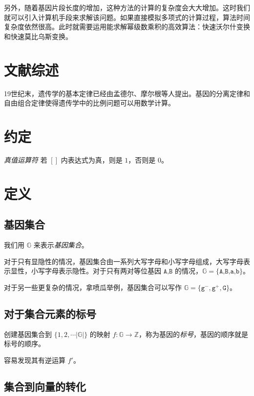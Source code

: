 \documentclass{article}
\begin{document}
另外，随着基因片段长度的增加，这种方法的计算的复杂度会大大增加。这时我们就可以引入计算机手段来求解该问题。如果直接模拟多项式的计算过程，算法时间复杂度依然很高。此时就需要运用能求解幂级数乘积的高效算法：快速沃尔什变换和快速莫比乌斯变换。

\section{文献综述}

19世纪末，遗传学的基本定律已经由孟德尔、摩尔根等人提出。基因的分离定律和自由组合定律使得遗传学中的比例问题可以用数学计算。


\section{约定}

\textsl{真值运算符} \qquad 若 $[]$ 内表达式为真，则是 $1$，否则是 $0$。

\section{定义}


\subsection{基因集合}

我们用 $\mathbb{G}$ 来表示\textsl{基因集合}。

对于只有显隐性的情况，基因集合由一系列大写字母和小写字母组成，大写字母表示显性，小写字母表示隐性。对于只有两对等位基因 $\texttt{A,B}$ 的情况，$\mathbb{G}=\{\texttt{A,B,a,b}\}$。

对于另一些更复杂的情况，拿喷瓜举例，基因集合可以写作 $\mathbb{G}=\{\texttt{g}^{-},\texttt{g}^{+},\texttt{G}\}$。

\subsection{对于集合元素的标号}

创建基因集合到 $\{1,2,\cdots |\mathbb{G}|\}$ 的映射 $f:\mathbb{G} \to \mathbb{Z}$，称为基因的\textsl{标号}，基因的顺序就是标号的顺序。

容易发现其有逆运算 $f'$。

\subsection{集合到向量的转化}
\end{document}
